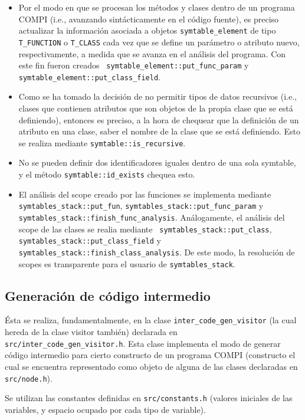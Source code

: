 \documentclass[12pt, a4paper, titlepage]{article}
\begin{document}
  \begin{itemize}
    \item Por el modo en que se procesan los métodos y clases dentro de un
    programa COMPI (i.e., avanzando sintácticamente en el código fuente), es
    preciso actualizar la información asociada a objetos {\tt symtable\_element}
    de tipo {\tt T\_FUNCTION} o {\tt T\_CLASS} cada vez que se define un
    parámetro o atributo nuevo, respectivamente, a medida que se avanza en el
    análisis del programa. Con este fin fueron creados {\tt
    symtable\_element::put\_func\_param} y {\tt
    symtable\_element::put\_class\_field}.
  	\item Como se ha tomado la decisión de no permitir tipos de datos recursivos
  	(i.e., clases que contienen atributos que son objetos de la propia clase que
  	se está definiendo), entonces es preciso, a la hora de chequear que la
  	definición de un atributo en una clase, saber el nombre de la clase que se
  	está definiendo. Esto se realiza mediante {\tt symtable::is\_recursive}.
  	\item No se pueden definir dos identificadores iguales dentro de una sola
  	symtable, y el método {\tt symtable::id\_exists} chequea esto.
  	\item El análisis del scope creado por las funciones se implementa mediante
  	{\tt symtables\_stack::put\_fun}, {\tt symtables\_stack::put\_func\_param} y
  	{\tt symtables\_stack::finish\_func\_analysis}. Análogamente, el análisis
  	del scope de las clases se realia mediante {\tt
  	symtables\_stack::put\_class}, {\tt symtables\_stack::put\_class\_field} y
  	{\tt symtables\_stack::finish\_class\_analysis}. De este modo, la resolución
  	de scopes es transparente para el usuario de {\tt symtables\_stack}.
  \end{itemize}

  \subsection{Generación de código intermedio}

	Ésta se realiza, fundamentalmente, en la clase {\tt inter\_code\_gen\_visitor}
	(la cual hereda de la clase visitor también) declarada en {\tt
	src/inter\_code\_gen\_visitor.h}. Esta clase implementa el modo de generar
	código intermedio para cierto constructo de un programa COMPI (constructo el
	cual se encuentra representado como objeto de alguna de las clases declaradas
	en {\tt src/node.h}).

	Se utilizan las constantes definidas en {\tt src/constants.h} (valores
	iniciales de las variables, y espacio ocupado por cada tipo de variable).
\end{document}
